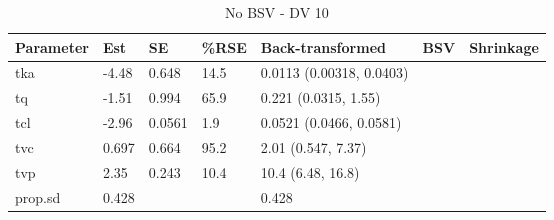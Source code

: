 \begin{table}
\centering\centering
\caption{No BSV - DV 10}
\centering
\fontsize{8}{10}\selectfont
\begin{tabular}[t]{lllllll}
\toprule
\textbf{Parameter} & \textbf{Est} & \textbf{SE} & \textbf{\%RSE} & \textbf{Back-transformed} & \textbf{BSV} & \textbf{Shrinkage}\\
\midrule
tka & -4.48 & 0.648 & 14.5 & 0.0113 (0.00318, 0.0403) &  & \\
\midrule
tq & -1.51 & 0.994 & 65.9 & 0.221 (0.0315, 1.55) &  & \\
\midrule
tcl & -2.96 & 0.0561 & 1.9 & 0.0521 (0.0466, 0.0581) &  & \\
\midrule
tvc & 0.697 & 0.664 & 95.2 & 2.01 (0.547, 7.37) &  & \\
\midrule
tvp & 2.35 & 0.243 & 10.4 & 10.4 (6.48, 16.8) &  & \\
\midrule
prop.sd & 0.428 &  &  & 0.428 &  & \\
\bottomrule
\end{tabular}
\end{table}
